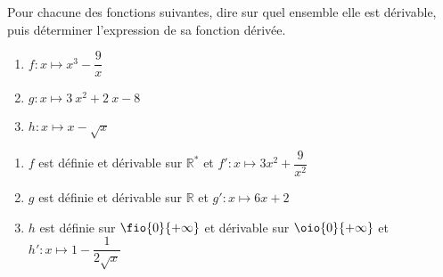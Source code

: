 \documentclass[a4paper,11pt,exos]{nsi} %
\begin{document}

\maketitle

\begin{exercice}
    Pour chacune des fonctions suivantes, dire sur quel ensemble elle est dérivable, puis déterminer l'expression de sa fonction dérivée.
    \begin{multicols}{3}
        \begin{enumerate}
            \item $f:x\longmapsto { x}^{3}-\dfrac{9}{{ x}}$
        
            \item $g:x\longmapsto 3~{ x}^{2}+2~ x-8$
            \item $h:x\longmapsto x-\sqrt{ x}$
        \end{enumerate}
    \end{multicols}
    
\end{exercice}

\begin{enumerate}[itemsep=1em]
    \item $f$ est définie et dérivable sur $\mathbb{R}^{\text{*}}$ et $ f':x\longmapsto 3x^2+\dfrac{9}{x^2}$
    \item $g$ est définie et dérivable sur $\mathbb{R}$ et $ g':x\longmapsto 6 x+2$
    
    \item $h$ est définie sur $\fio{0}{+\infty}$ et dérivable sur $\oio{0}{+\infty}$ et $ h':x\longmapsto 1-\dfrac{1}{2\sqrt{ x}}$
    \end{enumerate}
\end{document}
